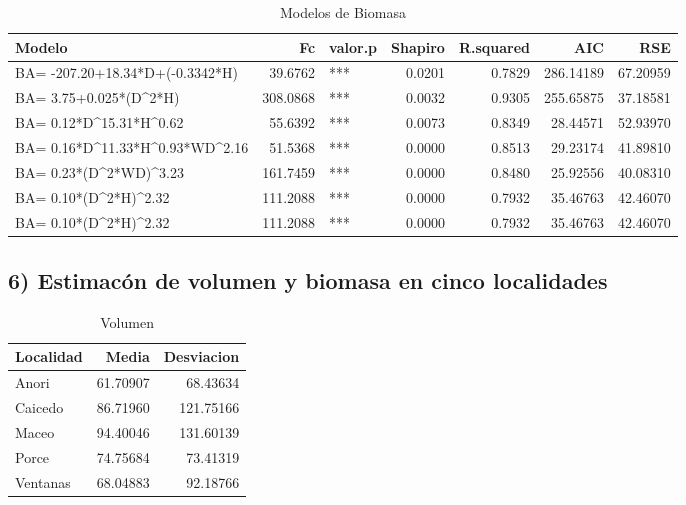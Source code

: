 \documentclass[9pt,onecolumn,twoside,]{pinp}
\begin{document}
\begin{table}

\caption{\label{tab:unnamed-chunk-24}Modelos de Biomasa}
\centering
\begin{tabular}[t]{l|r|l|r|r|r|r}
\hline
Modelo & Fc & valor.p & Shapiro & R.squared & AIC & RSE\\
\hline
BA= -207.20+18.34*D+(-0.3342*H) & 39.6762 & *** & 0.0201 & 0.7829 & 286.14189 & 67.20959\\
\hline
BA= 3.75+0.025*(D\textasciicircum{}2*H) & 308.0868 & *** & 0.0032 & 0.9305 & 255.65875 & 37.18581\\
\hline
BA= 0.12*D\textasciicircum{}15.31*H\textasciicircum{}0.62 & 55.6392 & *** & 0.0073 & 0.8349 & 28.44571 & 52.93970\\
\hline
BA= 0.16*D\textasciicircum{}11.33*H\textasciicircum{}0.93*WD\textasciicircum{}2.16 & 51.5368 & *** & 0.0000 & 0.8513 & 29.23174 & 41.89810\\
\hline
BA= 0.23*(D\textasciicircum{}2*WD)\textasciicircum{}3.23 & 161.7459 & *** & 0.0000 & 0.8480 & 25.92556 & 40.08310\\
\hline
BA= 0.10*(D\textasciicircum{}2*H)\textasciicircum{}2.32 & 111.2088 & *** & 0.0000 & 0.7932 & 35.46763 & 42.46070\\
\hline
BA= 0.10*(D\textasciicircum{}2*H)\textasciicircum{}2.32 & 111.2088 & *** & 0.0000 & 0.7932 & 35.46763 & 42.46070\\
\hline
\end{tabular}
\end{table}

\hypertarget{estimacuxf3n-de-volumen-y-biomasa-en-cinco-localidades}{%
\subsection{6) Estimacón de volumen y biomasa en cinco
localidades}\label{estimacuxf3n-de-volumen-y-biomasa-en-cinco-localidades}}

\begin{table}

\caption{\label{tab:unnamed-chunk-28}Volumen}
\centering
\begin{tabular}[t]{l|r|r}
\hline
Localidad & Media & Desviacion\\
\hline
Anori & 61.70907 & 68.43634\\
\hline
Caicedo & 86.71960 & 121.75166\\
\hline
Maceo & 94.40046 & 131.60139\\
\hline
Porce & 74.75684 & 73.41319\\
\hline
Ventanas & 68.04883 & 92.18766\\
\hline
\end{tabular}
\end{table}
\end{document}
